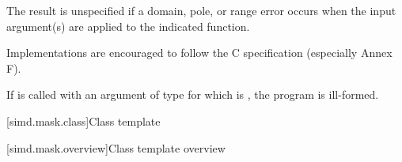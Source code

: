 \pnum
The result is unspecified if a domain, pole, or range error occurs when the input argument(s) are applied to the indicated  function.
\begin{note}Implementations are encouraged to follow the C specification (especially Annex F).\end{note}

\pnum
{}

\pnum
If  is called with an argument of type  for which  is , the program is ill-formed.

[simd.mask.class]{Class template }

[simd.mask.overview]{Class template  overview}

